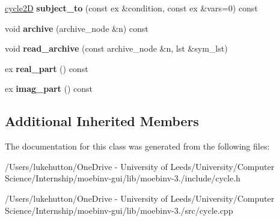 \begin{DoxyCompactItemize}
\mbox{\label{class_moeb_inv_1_1cycle2_d_ac4210321a02f39f5bf1c04aee1d9142b}} 
\mbox{\hyperlink{class_moeb_inv_1_1cycle2_d}{cycle2D}} {\bfseries subject\+\_\+to} (const ex \&condition, const ex \&vars=0) const
\item 
\mbox{\label{class_moeb_inv_1_1cycle2_d_a530eb35e47b47a497bbb301dd041c3a2}} 
void {\bfseries archive} (archive\+\_\+node \&n) const
\item 
\mbox{\label{class_moeb_inv_1_1cycle2_d_a7d1da2385f403d7e7882ac244a37ae28}} 
void {\bfseries read\+\_\+archive} (const archive\+\_\+node \&n, lst \&sym\+\_\+lst)
\item 
\mbox{\label{class_moeb_inv_1_1cycle2_d_a35387bf646d1059bae865598759c6ce4}} 
ex {\bfseries real\+\_\+part} () const
\item 
\mbox{\label{class_moeb_inv_1_1cycle2_d_a78c4ec1b31bdb419fa8a23c225bba587}} 
ex {\bfseries imag\+\_\+part} () const
\end{DoxyCompactItemize}
\subsection*{Additional Inherited Members}


The documentation for this class was generated from the following files\+:\begin{DoxyCompactItemize}
\item 
/\+Users/lukehutton/\+One\+Drive -\/ University of Leeds/\+University/\+Computer Science/\+Internship/moebinv-\/gui/lib/moebinv-\/3./include/cycle.\+h\item 
/\+Users/lukehutton/\+One\+Drive -\/ University of Leeds/\+University/\+Computer Science/\+Internship/moebinv-\/gui/lib/moebinv-\/3./src/cycle.\+cpp\end{DoxyCompactItemize}
